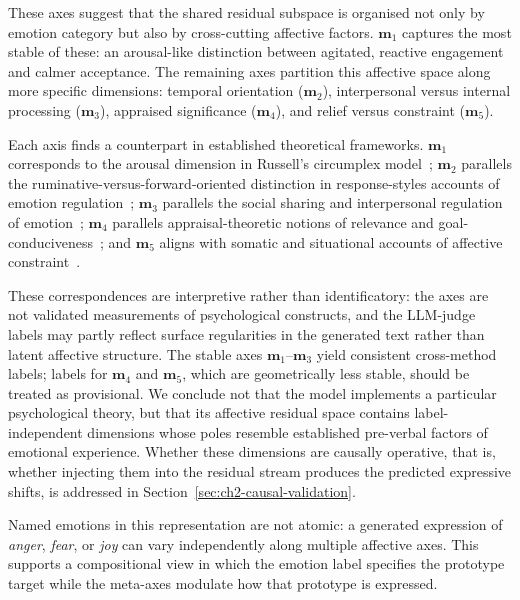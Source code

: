 These axes suggest that the shared residual subspace is organised not only by emotion category but also by cross-cutting affective factors. $\mathbf{m}_1$ captures the most stable of these: an arousal-like distinction between agitated, reactive engagement and calmer acceptance. The remaining axes partition this affective space along more specific dimensions: temporal orientation ($\mathbf{m}_2$), interpersonal versus internal processing ($\mathbf{m}_3$), appraised significance ($\mathbf{m}_4$), and relief versus constraint ($\mathbf{m}_5$).\par

Each axis finds a counterpart in established theoretical frameworks. $\mathbf{m}_1$ corresponds to the arousal dimension in Russell's circumplex model~\cite{russell1980circumplex}; $\mathbf{m}_2$ parallels the ruminative-versus-forward-oriented distinction in response-styles accounts of emotion regulation~\cite{nolenhoeksema1991responses}; $\mathbf{m}_3$ parallels the social sharing and interpersonal regulation of emotion~\cite{rime2009socialsharing}; $\mathbf{m}_4$ parallels appraisal-theoretic notions of relevance and goal-conduciveness~\cite{scherer2001appraisal}; and $\mathbf{m}_5$ aligns with somatic and situational accounts of affective constraint~\cite{damasio1996somatic}.\par

These correspondences are interpretive rather than identificatory: the axes are not validated measurements of psychological constructs, and the LLM-judge labels may partly reflect surface regularities in the generated text rather than latent affective structure. The stable axes $\mathbf{m}_1$--$\mathbf{m}_3$ yield consistent cross-method labels; labels for $\mathbf{m}_4$ and $\mathbf{m}_5$, which are geometrically less stable, should be treated as provisional. We conclude not that the model implements a particular psychological theory, but that its affective residual space contains label-independent dimensions whose poles resemble established pre-verbal factors of emotional experience. Whether these dimensions are causally operative, that is, whether injecting them into the residual stream produces the predicted expressive shifts, is addressed in Section~\ref{sec:ch2-causal-validation}.\par

Named emotions in this representation are not atomic: a generated expression of \textit{anger}, \textit{fear}, or \textit{joy} can vary independently along multiple affective axes. This supports a compositional view in which the emotion label specifies the prototype target while the meta-axes modulate how that prototype is expressed.\par

